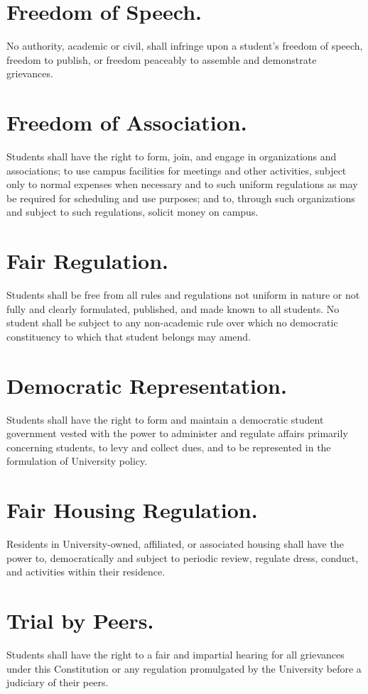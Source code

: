 \section{Freedom of Speech.}
    No authority, academic or civil, shall infringe upon a student's freedom of speech, freedom to publish, or freedom peaceably to assemble and demonstrate grievances.


\section{Freedom of Association.}
    Students shall have the right to form, join, and engage in organizations and associations; to use campus facilities for meetings and other activities, subject only to normal expenses when necessary and to such uniform regulations as may be required for scheduling and use purposes; and to, through such organizations and subject to such regulations, solicit money on campus.


\section{Fair Regulation.}
    Students shall be free from all rules and regulations not uniform in nature or not fully and clearly formulated, published, and made known to all students. No student shall be subject to any non-academic rule over which no democratic constituency to which that student belongs may amend.


\section{Democratic Representation.}
    Students shall have the right to form and maintain a democratic student government vested with the power to administer and regulate affairs primarily concerning students, to levy and collect dues, and to be represented in the formulation of University policy.


\section{Fair Housing Regulation.}
    Residents in University-owned, affiliated, or associated housing shall have the power to, democratically and subject to periodic review, regulate dress, conduct, and activities within their residence.


\section{Trial by Peers.}
    Students shall have the right to a fair and impartial hearing for all grievances under this Constitution or any regulation promulgated by the University before a judiciary of their peers.


